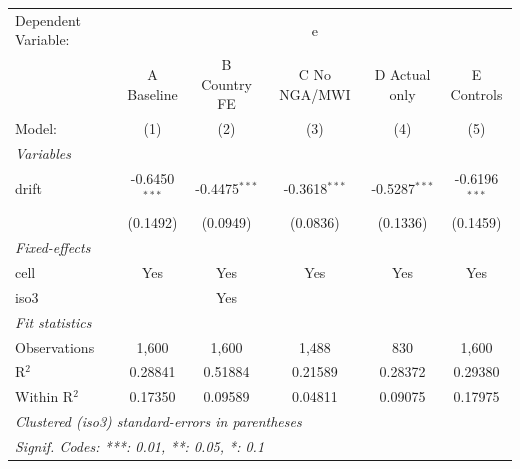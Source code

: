
\begingroup
\centering
\begin{tabular}{lccccc}
   \tabularnewline \midrule \midrule
   Dependent Variable: & \multicolumn{5}{c}{e}\\
                & A Baseline      & B Country FE    & C No NGA/MWI    & D Actual only   & E Controls \\   
   Model:       & (1)             & (2)             & (3)             & (4)             & (5)\\  
   \midrule
   \emph{Variables}\\
   drift        & -0.6450$^{***}$ & -0.4475$^{***}$ & -0.3618$^{***}$ & -0.5287$^{***}$ & -0.6196$^{***}$\\   
                & (0.1492)        & (0.0949)        & (0.0836)        & (0.1336)        & (0.1459)\\   
   \midrule
   \emph{Fixed-effects}\\
   cell         & Yes             & Yes             & Yes             & Yes             & Yes\\  
   iso3         &                 & Yes             &                 &                 & \\  
   \midrule
   \emph{Fit statistics}\\
   Observations & 1,600           & 1,600           & 1,488           & 830             & 1,600\\  
   R$^2$        & 0.28841         & 0.51884         & 0.21589         & 0.28372         & 0.29380\\  
   Within R$^2$ & 0.17350         & 0.09589         & 0.04811         & 0.09075         & 0.17975\\  
   \midrule \midrule
   \multicolumn{6}{l}{\emph{Clustered (iso3) standard-errors in parentheses}}\\
   \multicolumn{6}{l}{\emph{Signif. Codes: ***: 0.01, **: 0.05, *: 0.1}}\\
\end{tabular}
\par\endgroup


